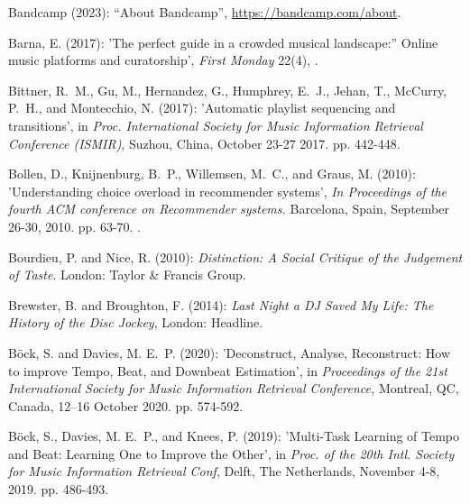 \documentclass[11pt,titlepage,oneside]{book}
\begin{document}
\begin{thebibliography}{97}
	Bandcamp (2023): \enquote{About {Bandcamp}},
	\urlprefix\url{https://bandcamp.com/about}.
	
	Barna, E. (2017): '{The} perfect guide in a crowded musical
		landscape:” {Online} music platforms and curatorship', \textit{First
		Monday} 22(4), .
	
	Bittner, R.~M., Gu, M., Hernandez, G., Humphrey, E.~J., Jehan, T., McCurry,
	P.~H., and Montecchio, N. (2017): 'Automatic playlist sequencing and
		transitions', in \textit{Proc. International Society for Music Information Retrieval Conference (ISMIR)}, Suzhou, China, October 23-27
		2017. pp. 442-448.
	
	Bollen, D., Knijnenburg, B.~P., Willemsen, M.~C., and Graus, M. (2010):
	'Understanding choice overload in recommender systems', \textit{In Proceedings of the fourth ACM conference on Recommender systems.} Barcelona, Spain, September 26-30, 2010. pp. 63-70. .
	
	Bourdieu, P. and Nice, R. (2010): \textit{Distinction: {A} {Social} {Critique}
		of the {Judgement} of {Taste}}. London: Taylor \& Francis
	Group.
	
	Brewster, B. and Broughton, F. (2014): \textit{Last {Night} a {DJ} {Saved} {My}
		{Life}: {The} {History} of the {Disc} {Jockey}}, London: Headline.
	
	Böck, S. and Davies, M. E.~P. (2020): 'Deconstruct, Analyse, Reconstruct: How to improve Tempo, Beat, and Downbeat Estimation', in \textit{Proceedings of the 21st International Society for Music Information Retrieval Conference,} Montreal, QC, Canada, 12–16 October 2020. pp. 574-592.
	
	Böck, S., Davies, M. E.~P., and Knees, P. (2019): 'Multi-Task Learning of Tempo and Beat: Learning One to Improve the Other', in \textit{Proc. of the 20th Intl. Society for Music
		Information Retrieval Conf}, Delft, The Netherlands, November 4-8, 2019. pp. 486-493.
	

\end{thebibliography}
\end{document}

